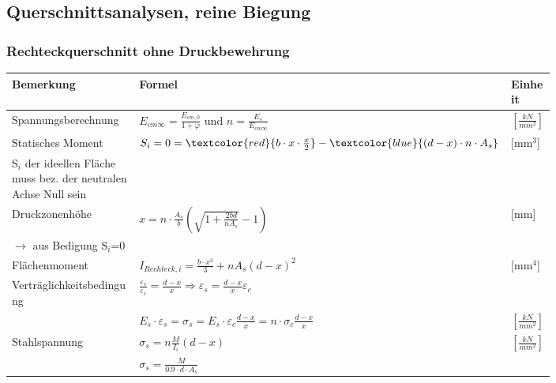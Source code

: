 \begin{landscape}
	
	\begin{multicols}{3}
		
		
		\subsection{Querschnittsanalysen, reine Biegung}
		
		\subsubsection{Rechteckquerschnitt ohne Druckbewehrung}
		
		
		\begin{tabular}{p{0.4\linewidth}|p{0.4\linewidth}|l}
			
			Bemerkung		& Formel		& Einheit \\ \hline
			
			
			\hspace*{0pt} Spannungsberechnung	& $ E_{cm\infty} = \frac{E_{cm,0}}{1 + \varphi} $ und $ n = \frac{E_s}{E_{cm\infty}} $	& $ \left[ \frac{kN}{mm^2}\right] $ \\
			
			Statisches Moment	& $ S_i = 0 = 
			\textcolor{red}{ b \cdot x \cdot \frac{x}{2} } - 
			\textcolor{blue}{ (d - x) \cdot n \cdot A_s } $ & [mm$^3$] \\
			S$_i$ der ideellen Fläche muss bez. der neutralen Achse Null sein &	& \\
			
			Druckzonenhöhe		& $ x = n \cdot \frac{A_s}{b} \left( \sqrt{1 + \frac{2 b d}{n A_s}} - 1 \right) $ & [mm] \\
			$ \rightarrow $ aus Bedigung S$_i$=0 & & \\
			
			Flächenmoment		& $ I_{Rechteck,i} = \frac{b \cdot x^3}{3} + n A_s (d - x)^2 $	& [mm$^4$] \\
			
			\hspace*{0pt} Verträglichkeitsbedingung & $ \frac{\varepsilon_s}{\varepsilon_c} = \frac{d - x}{x}
			\Rightarrow \varepsilon_s = \frac{d - x}{x} \varepsilon_c $	& \\
			& $ E_s \cdot \varepsilon_s = \sigma_s = E_s \cdot \varepsilon_c \frac{d - x}{x} = n \cdot \sigma_c \frac{d - x}{x} $	& $ \left[ \frac{kN}{mm^2}\right] $ 	\\
			
			Stahlspannung			& $ \sigma_s = n \frac{M}{I_i} (d - x) $	& $ \left[ \frac{kN}{mm^2}\right] $ \\
			& $ \sigma_s = \frac{M}{0.9 \cdot d \cdot A_s} $	& \\
			

\end{tabular}
\end{multicols}
\end{landscape}
